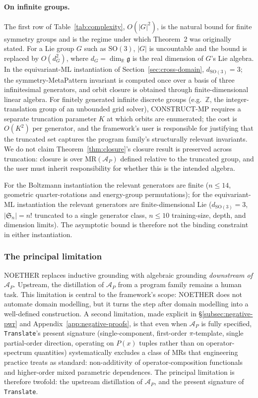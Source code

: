 \documentclass[acmsmall,screen,review]{acmart}
\begin{document}
\paragraph{On infinite groups.}
\label{subsec:complexity-prose}
The first row of Table~\ref{tab:complexity}, $O(|G|^2)$, is the natural bound for finite symmetry groups and is the regime under which Theorem~2 was originally stated. For a Lie group $G$ such as $\mathrm{SO}(3)$, $|G|$ is uncountable and the bound is replaced by $O(d_G^2)$, where $d_G = \dim_{\mathbb{R}} \mathfrak{g}$ is the real dimension of $G$'s Lie algebra. In the equivariant-ML instantiation of Section~\ref{sec:cross-domain}, $d_{\mathrm{SO}(3)} = 3$; the symmetry-MetaPattern invariant is computed once over a basis of three infinitesimal generators, and orbit closure is obtained through finite-dimensional linear algebra. For finitely generated infinite discrete groups (e.g.\ $\mathbb{Z}$, the integer-translation group of an unbounded grid solver), CONSTRUCT-MP requires a separate truncation parameter $K$ at which orbits are enumerated; the cost is $O(K^2)$ per generator, and the framework's user is responsible for justifying that the truncated set captures the program family's structurally relevant invariants. We do not claim Theorem~\ref{thm:closure}'s closure result is preserved across truncation: closure is over $\mathrm{MR}(\mathcal{A}_P)$ defined relative to the truncated group, and the user must inherit responsibility for whether this is the intended algebra.

For the Boltzmann instantiation the relevant generators are finite ($n \le 14$, geometric quarter-rotations and energy-group permutations); for the equivariant-ML instantiation the relevant generators are finite-dimensional Lie ($d_{\mathrm{SO}(3)} = 3$, $|\mathfrak{S}_n| = n!$ truncated to a single generator class, $n \le 10$ training-size, depth, and dimension limits). The asymptotic bound is therefore not the binding constraint in either instantiation.

\subsubsection{The principal limitation}

NOETHER replaces inductive grounding with algebraic grounding \emph{downstream of $\mathcal{A}_P$}. Upstream, the distillation of $\mathcal{A}_P$ from a program family remains a human task. This limitation is central to the framework's scope: NOETHER does not automate domain modelling, but it turns the step after domain modelling into a well-defined construction. A second limitation, made explicit in \S\ref{subsec:negative-pwr} and Appendix~\ref{app:negative-proofs}, is that even when $\mathcal{A}_P$ is fully specified, \texttt{Translate}'s present signature (single-component, first-order $\pi$-template, single partial-order direction, operating on $P(x)$ tuples rather than on operator-spectrum quantities) systematically excludes a class of MRs that engineering practice treats as standard: non-additivity of operator-composition functionals and higher-order mixed parametric dependences. The principal limitation is therefore twofold: the upstream distillation of $\mathcal{A}_P$, and the present signature of \texttt{Translate}.
\end{document}
